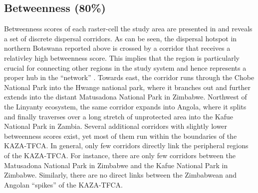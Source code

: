 \documentclass[abstract=on,10pt,a4paper,bibliography=totocnumbered]{article}
\begin{document}
\subsection{Betweenness (80\%)}
Betweenness scores of each raster-cell the study area are presented in
 and reveals a set of discrete dispersal corridors. As can be
seen, the dispersal hotspot in northern Botswana reported above is crossed by
a corridor that receives a relativley high betweenness score. This implies that
the region is particularly crucial for connecting other regions in the study
system and hence represents a proper hub in the  ``network'' . Towards east, the
corridor runs through the Chobe National Park into the Hwange national park,
where it branches out and further extends into the distant Matusadona National
Park in Zimbabwe. Northwest of the Linyanty ecosystem, the same corridor expands
into Angola, where it splits and finally traverses over a long stretch of
unprotected area into the Kafue National Park in Zambia. Several additional
corridors with slightly lower betweenness scores exist, yet most of them run
within the boundaries of the KAZA-TFCA. In general, only few corridors directly
link the peripheral regions of the KAZA-TFCA. For instance, there are only few
corridors between the Matusadona National Park in Zimbabwe and the Kafue
National Park in Zimbabwe. Similarly, there are no direct links between the
Zimbabwean and Angolan ``spikes'' of the KAZA-TFCA.
\end{document}
